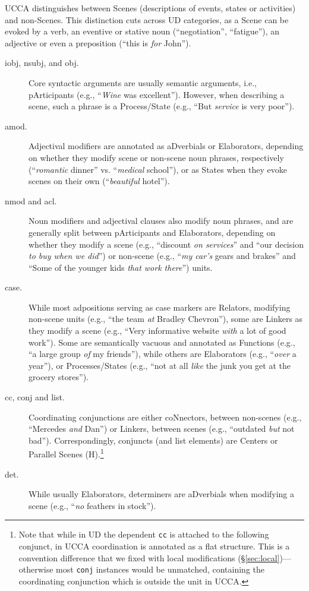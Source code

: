 \documentclass[11pt,a4paper]{article}
\begin{document}
      UCCA distinguishes between Scenes (descriptions of events, states or activities)
      and non-Scenes. 
      This distinction cuts across UD categories,
      as a Scene can be evoked by a verb, an eventive or stative
      noun (``negotiation'', ``fatigue''),
      an adjective or even a preposition (``this is \textit{for} John'').
\begin{description}
	\item[iobj, nsubj, and obj.]
	Core syntactic arguments are usually semantic arguments,
    i.e., pArticipants (e.g., ``\textit{Wine} was excellent'').
	However, when describing a scene, such a phrase is a Process/State
	(e.g., ``But \textit{service} is very poor'').
	\item[amod.]
	Adjectival modifiers are annotated as aDverbials or Elaborators,
	depending on whether they modify scene or non-scene noun phrases, respectively
	(``\textit{romantic} dinner'' vs. ``\textit{medical} school''), or
	as States when
	they evoke scenes on their own (``\textit{beautiful} hotel'').
	\item[nmod and acl.]
	Noun modifiers and adjectival clauses also modify noun phrases, and
	are generally split between pArticipants and Elaborators,
	depending on whether they modify a scene
	(e.g., ``discount \textit{on services}'' and
	``our decision \textit{to buy when we did}'')
	or non-scene (e.g., ``\textit{my car's} gears and brakes'' and
	``Some of the younger kids \textit{that work there}'') units.
	\item[case.]
	While most adpositions serving as case markers are Relators,
	modifying non-scene units (e.g., ``the team \textit{at} Bradley Chevron''),
	some are Linkers as they modify a scene
	(e.g., ``Very informative website \textit{with} a lot of good work'').
	Some are semantically vacuous and annotated as Functions
	(e.g., ``a large group \textit{of} my friends''),
	while others are Elaborators (e.g., ``\textit{over} a year''),
	or Processes/States
	(e.g., ``not at all \textit{like} the junk you get at the grocery stores'').
	\item[cc, conj and list.]
	Coordinating conjunctions are either coNnectors, between non-scenes
	(e.g., ``Mercedes \textit{and} Dan'')
	or Linkers, between scenes
	(e.g., ``outdated \textit{but} not bad'').
	Correspondingly, conjuncts (and list elements)
	are Centers or Parallel Scenes (H).\footnote{Note
    that while in UD the dependent \texttt{cc} is attached to the following conjunct,
	in UCCA coordination is annotated as a flat structure.
	This is a convention difference that we fixed with local modifications
	(\S\ref{sec:local})---otherwise most \texttt{conj} instances would be unmatched,
	containing the coordinating conjunction which is outside the unit in UCCA.}
	\item[det.]
	While usually Elaborators,
	determiners are aDverbials when modifying a scene
	(e.g., ``\textit{no} feathers in stock'').
\end{description}
\end{document}
